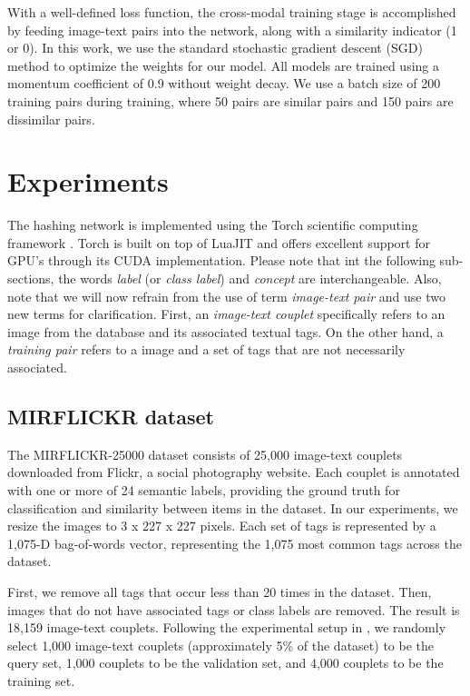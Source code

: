 \documentclass[letterpaper]{article}
\begin{document}
With a well-defined loss function, the cross-modal training stage is accomplished by feeding image-text pairs into the network, along with a similarity indicator (1 or 0). In this work, we use the standard stochastic gradient descent (SGD)  method to optimize the weights for our model. All models are trained using a momentum coefficient of 0.9 without weight decay. We use a batch size of 200 training pairs during training, where 50 pairs are similar pairs and 150 pairs are dissimilar pairs.

\section{Experiments}

The hashing network is implemented using the Torch scientific computing framework \cite{torch}. Torch is built on top of LuaJIT and offers excellent support for GPU's through its CUDA implementation. Please note that int the following sub-sections, the words \emph{label} (or \emph{class label}) and \emph{concept} are interchangeable. Also, note that we will now refrain from the use of term \emph{image-text pair} and use two new terms for clarification. First, an \emph{image-text couplet} specifically refers to an image from the database and its associated textual tags. On the other hand, a \emph{training pair} refers to a image and a set of tags that are not necessarily associated. 

\subsection{MIRFLICKR dataset}

The MIRFLICKR-25000 dataset \cite{flickr} consists of 25,000 image-text couplets downloaded from Flickr, a social photography website. Each couplet is annotated with one or more of 24 semantic labels, providing the ground truth for classification and similarity between items in the dataset. In our experiments, we resize the images to 3 x 227 x 227 pixels. Each set of tags is represented by a 1,075-D bag-of-words vector, representing the 1,075 most common tags across the dataset.

First, we remove all tags that occur less than 20 times in the dataset. Then, images that do not have associated tags or class labels are removed. The result is 18,159 image-text couplets. Following the experimental setup in \cite{cdq,chn}, we randomly select 1,000 image-text couplets (approximately 5\% of the dataset) to be the query set, 1,000 couplets to be the validation set, and 4,000 couplets to be the training set.
\end{document}
